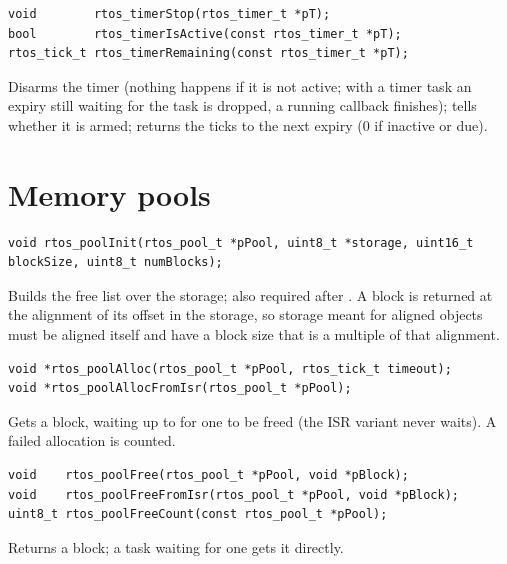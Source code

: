 \begin{lstlisting}
void        rtos_timerStop(rtos_timer_t *pT);
bool        rtos_timerIsActive(const rtos_timer_t *pT);
rtos_tick_t rtos_timerRemaining(const rtos_timer_t *pT);
\end{lstlisting}
Disarms the timer (nothing happens if it is not active; with a timer task an expiry
still waiting for the task is dropped, a running callback finishes); tells whether it is
armed; returns the ticks to the next expiry (0 if inactive or due).

\section{Memory pools}

\begin{lstlisting}
void rtos_poolInit(rtos_pool_t *pPool, uint8_t *storage, uint16_t blockSize, uint8_t numBlocks);
\end{lstlisting}
Builds the free list over the storage; also required after . A
block is returned at the alignment of its offset in the storage, so storage meant for
aligned objects must be aligned itself and have a block size that is a multiple of that
alignment.

\begin{lstlisting}
void *rtos_poolAlloc(rtos_pool_t *pPool, rtos_tick_t timeout);
void *rtos_poolAllocFromIsr(rtos_pool_t *pPool);
\end{lstlisting}
Gets a block, waiting up to  for one to be freed (the ISR variant never
waits). A failed allocation is counted.

\begin{lstlisting}
void    rtos_poolFree(rtos_pool_t *pPool, void *pBlock);
void    rtos_poolFreeFromIsr(rtos_pool_t *pPool, void *pBlock);
uint8_t rtos_poolFreeCount(const rtos_pool_t *pPool);
\end{lstlisting}
Returns a block; a task waiting for one gets it directly.

